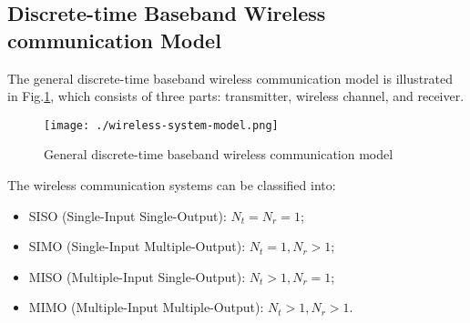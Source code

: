 \subsection{Discrete-time Baseband Wireless communication Model}

The general discrete-time baseband wireless communication model is illustrated in Fig.\ref{fig:wireless-system-model}, which consists of three 
parts: transmitter, wireless channel, and receiver.

\begin{figure}[htbp]
  \centering
  \texttt{[image: ./wireless-system-model.png]}
  \caption{General discrete-time baseband wireless communication model}
  \label{fig:wireless-system-model}
\end{figure}

The wireless communication systems can be classified into:
\begin{itemize}
    \item SISO (Single-Input Single-Output): $N_t=N_r=1$;
    \item SIMO (Single-Input Multiple-Output): $N_t=1, N_r > 1$;
    \item MISO (Multiple-Input Single-Output): $N_t>1, N_r=1$;
    \item MIMO (Multiple-Input Multiple-Output): $N_t>1, N_r>1$. 
\end{itemize}

